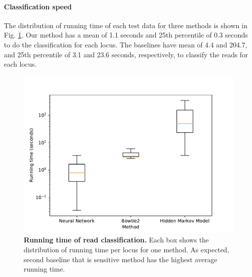 \paragraph{Classification speed}
The distribution of running time of each test data for three methods is shown in Fig. \ref{fig:running_time}. Our method has a mean of 1.1 seconds and 25th percentile of 0.3 seconds to do the classification for each locus. The baselines have mean of 4.4 and 204.7, and 25th percentile of 3.1 and 23.6 seconds, respectively, to classify the reads for each locus.
\begin{figure}[ht]
\vskip -0.1in
\begin{center}
\centerline{\includegraphics[width=\columnwidth]{fig/hmm_dnn_running_time.pdf}}
\caption{\footnotesize{\bf Running time of read classification.}
 Each box shows the distribution of running time per locus for one method. As expected, second baseline that is sensitive method has the highest average running time.}
  \label{fig:running_time}
\end{center}
\vspace{-0.3in}
\end{figure}

